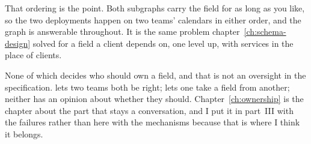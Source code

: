 %
That ordering is the point. Both subgraphs carry the field for as long as you
like, so the two deployments happen on two teams' calendars in either order,
and the graph is answerable throughout. It is the same problem
chapter~\ref{ch:schema-design} solved for a field a client depends on, one level
up, with services in the place of clients.

%
None of which decides who should own a field, and that is not an oversight in
the specification.  lets two teams both be right;
 lets one take a field from another; neither has an opinion
about whether they should. Chapter~\ref{ch:ownership} is the chapter about the
part that stays a conversation, and I put it in part~III with the failures
rather than here with the mechanisms because that is where I think it belongs.
%
